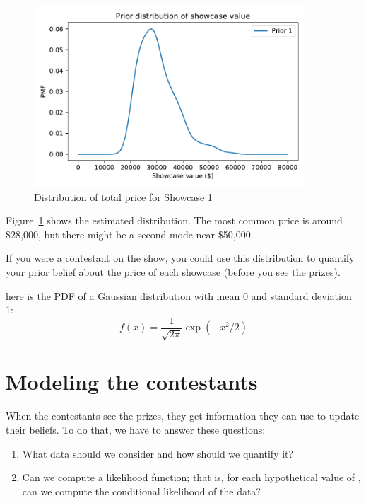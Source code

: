\documentclass[12pt]{book}
\theoremstyle{exercise}
\begin{document}
\begin{figure}
\centerline{\includegraphics[width=4in]{figs/fig08-01.pdf}}
\caption{Distribution of total price for Showcase 1}
\label{fig08-01}
\end{figure}

Figure~\ref{fig08-01} shows the estimated distribution.  
The most common price is around
\$28,000, but there might be a second mode near \$50,000.

If you were a contestant on the
show, you could use this distribution to quantify your prior belief
about the price of each showcase (before you see the prizes).


here is the PDF of a Gaussian distribution with
mean 0 and standard deviation 1:
%
\[ f(x) = \frac{1}{\sqrt{2 \pi}} \exp(-x^2/2) \]
%





\section{Modeling the contestants}

When the contestants see the prizes, they get information they can use to update their beliefs.
To do that, we have to answer these questions:

\begin{enumerate}

\item What data should we consider and how should we quantify it?

\item Can we compute a likelihood function; that is,
  for each hypothetical value of , can we compute
  the conditional likelihood of the data?

\end{enumerate}
\end{document}

